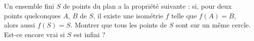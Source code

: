 Un ensemble fini $S$ de points du plan a la propriété suivante : si, pour deux points quelconques $A$, $B$ de $S$, il existe une isométrie $f$ telle que $f(A) = B$, alors aussi $f(S) = S$. Montrer que tous les points de $S$ sont sur un même cercle. Est-ce encore vrai si $S$ est infini ?
